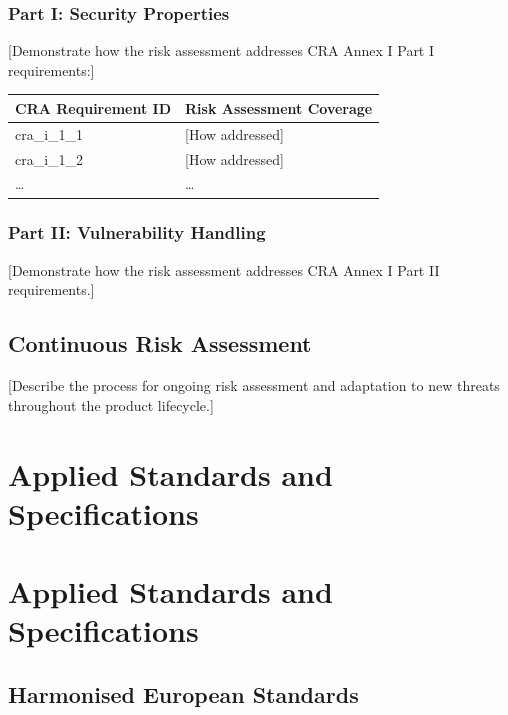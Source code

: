 \documentclass[
  11 pt,
  a4paper,
  table]{report}
\begin{document}
\subsection{Part I: Security
Properties}\label{part-i-security-properties}

{[}Demonstrate how the risk assessment addresses CRA Annex I Part I
requirements:{]}

\begin{longtable}[]{@{}ll@{}}
\toprule\noalign{}
CRA Requirement ID & Risk Assessment Coverage \\
\midrule\noalign{}
\endhead
\bottomrule\noalign{}
\endlastfoot
cra\_i\_1\_1 & {[}How addressed{]} \\
cra\_i\_1\_2 & {[}How addressed{]} \\
\ldots{} & \ldots{} \\
\end{longtable}

\subsection{Part II: Vulnerability
Handling}\label{part-ii-vulnerability-handling}

{[}Demonstrate how the risk assessment addresses CRA Annex I Part II
requirements.{]}

\section{Continuous Risk Assessment}\label{continuous-risk-assessment}

{[}Describe the process for ongoing risk assessment and adaptation to
new threats throughout the product lifecycle.{]}


\chapter{Applied Standards and
Specifications}\label{applied-standards-and-specifications}


\chapter{Applied Standards and
Specifications}\label{applied-standards-and-specifications-1}

\section{Harmonised European
Standards}\label{harmonised-european-standards}
\end{document}
